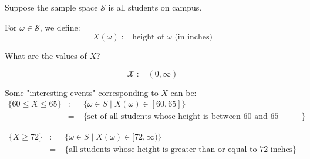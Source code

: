 \begin{ex}Suppose the sample space $\mathcal{S}$ is all students on campus.

For $ \omega \in \mathcal{S}$, we define:
\[
X(\omega) := \text{height of } \omega \text{ (in inches)}
\]

What are the values of \( X \)?

\[
\mathcal{X} := (0, \infty)
\]

Some "interesting events" corresponding to $X$ can be:
\begin{eqnarray*}
    \{ 60 \leq X \leq 65 \} &:=& \{ \omega \in S \mid X(\omega) \in [60, 65] \}\\
&=& \{\text{set of all students whose height is between 60 and 65 inches.}\}
\end{eqnarray*}

\begin{eqnarray*}
    \{X \ge 72\} &:=& \{ \omega \in S \mid X(\omega) \in [72, \infty) \}\\
    &=&\{\text{all students whose height is greater than or equal to 72 inches}\} 
\end{eqnarray*}

    
\end{ex}
